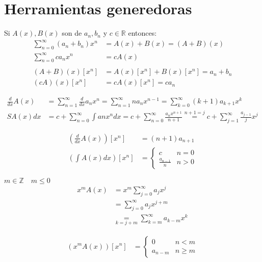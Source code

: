 \documentclass[../main.tex]{subfiles}
\begin{document}
\chapter{Herramientas generedoras}%

\thispagestyle{fancy}

Si $A(x),B(x)$ son 
de $a_n,b_n$ y $c\in\mathbb{R}$ entonces:
\begin{align*}
	\sum_{n=0}^\infty
	(a_n+b_n)
	x^n
	&=
	A(x)+B(x) = (A+B)(x)\\
	\sum_{n=0}^\infty
	ca_nx^n &= cA(x)\\
	\\
	(A+B)(x)[x^n] &= A(x)[x^n]+B(x)[x^n]=a_n+b_n\\
	(cA)(x)[x^n] &= cA(x)[x^n] = ca_n
\end{align*}

\begin{align*}
	\frac{d}{dx} A(x)
	&= \sum_{n=1}^\infty
	\frac{d}{dx} a_nx^n
	= \sum_{n=1}^\infty
	na_nx^{n-1}
	= \sum_{k=0}^\infty
	(k+1)a_{k+1}x^k\\
	SA(x)dx &=
	c+
	\sum_{n=0}^\infty
	\int anx^ndx
	= c+
	\sum_{n=0}^\infty
	\frac{a_nx^{n+1}}{n+1}
	\overset
	{
		n+1=j
	}
	{
		=
	}
	c+
	\sum_{j=1}^\infty
	\frac{a_{j-1}}{j} x^j
\end{align*}

\begin{align*}
	\left(
		\frac{d}{dx} A(x)
	\right)
	[x^n] &= (n+1)a_{n+1}\\
	\left(
		\int A(x)dx
	\right)
	[x^n] &=
	\begin{cases}
		c &n=0\\
		\frac{a_{n-1}}{n} &n > 0
	\end{cases}
\end{align*}

$m\in\mathbb{Z} \quad m \leq 0$
\begin{align*}
	x^m A(x) &= x^m
	\sum_{j=0}^\infty
	a_jx^j\\
	&=
	\sum_{j=0}^\infty
	a_jx^{j+m}\\
	&
	\underset
	{
		k=j+m
	}
	{
		=
	}
	\sum_{k=m}^\infty
	a_{k-m}x^k
\end{align*}

\begin{align*}
	(x^m A(x))[x^n] &=
	\begin{cases}
		0 &n < m\\
		a_{n-m} &n \geq m
	\end{cases}
\end{align*}
\end{document}

